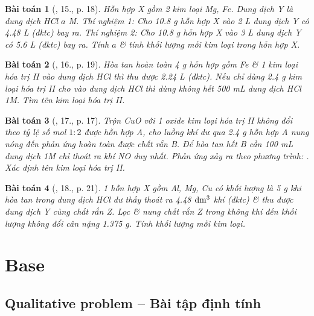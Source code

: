 \documentclass{article}
\newtheorem{baitoan}{Bài toán}
\begin{document}
\begin{baitoan}[\cite{An_350_BT_Hoa_Hoc_9}, 15., p. 18]
	Hỗn hợp X gồm 2 kim loại \emph{Mg, Fe}. Dung dịch Y là dung dịch \emph{HCl $a$ M}. Thí nghiệm 1: Cho \emph{10.8 g} hỗn hợp X vào \emph{2 L} dung dịch Y có \emph{4.48 L } (đktc) bay ra. Thí nghiệm 2: Cho \emph{10.8 g} hỗn hợp X vào \emph{3 L} dung dịch Y có \emph{5.6 L } (đktc) bay ra. Tính $a$ \& tính khối lượng mỗi kim loại trong hỗn hợp X.
\end{baitoan}

\begin{baitoan}[\cite{An_350_BT_Hoa_Hoc_9}, 16., p. 19]
	Hòa tan hoàn toàn \emph{4 g} hỗn hợp gồm \emph{Fe} \& 1 kim loại hóa trị II vào dung dịch \emph{HCl} thì thu được \emph{2.24 L } (đktc). Nếu chỉ dùng \emph{2.4 g} kim loại hóa trị II cho vào dung dịch \emph{HCl} thì dùng không hết \emph{500 mL} dung dịch \emph{HCl 1M}. Tìm tên kim loại hóa trị II.
\end{baitoan}

\begin{baitoan}[\cite{An_350_BT_Hoa_Hoc_9}, 17., p. 17]
	Trộn \emph{CuO} với 1 oxide kim loại hóa trị II không đổi theo tỷ lệ số mol $1:2$ được hỗn hợp A, cho luồng khí \emph{} dư qua \emph{2.4 g} hỗn hợp A nung nóng đến phản ứng hoàn toàn được chất rắn B. Để hòa tan hết B cần \emph{100 mL} dung dịch \emph{ 1M} chỉ thoát ra khí \emph{NO} duy nhất. Phản ứng xảy ra theo phương trình: \emph{}. Xác định tên kim loại hóa trị II.
\end{baitoan}

\begin{baitoan}[\cite{An_350_BT_Hoa_Hoc_9}, 18., p. 21]
	1 hỗn hợp X gồm \emph{Al, Mg, Cu} có khối lượng là \emph{5 g} khi hòa tan trong dung dịch \emph{HCl} dư thấy thoát ra \emph{4.48 $\rm dm^3$} khí (đktc) \& thu được dung dịch Y cùng chất rắn Z. Lọc \& nung chất rắn Z trong không khí đến khối lượng không đổi cân nặng \emph{1.375 g}. Tính khối lượng mỗi kim loại.
\end{baitoan}


\section{Base}

\subsection{Qualitative problem -- Bài tập định tính}
\end{document}
